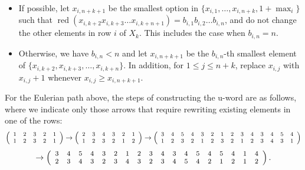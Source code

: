 \documentclass[12pt]{article}
\DeclareMathOperator{\red}{red}
\begin{document}
\begin{itemize}
\item If possible, let $x_{i,n+k+1}$ be the smallest option in  
$\{x_{i,1},\ldots,x_{i,n+k},1+\max_i\}$ such that  
$\red(x_{i,k+2}x_{i,k+3}\ldots x_{i,k+n+1}) = b_{i,1}b_{i,2}\ldots b_{i,n}$,  
and do not change the other elements in row $i$ of $X_k$.  
This includes the case when $b_{i,n} = n$.

\item Otherwise, we have $b_{i,n} < n$ and let $x_{i,n+k+1}$ be the $b_{i,n}$-th smallest element of  
$\{x_{i,k+2},x_{i,k+3},\ldots,x_{i,k+n}\}$.  
In addition, for $1 \leq j \leq n+k$, replace $x_{i,j}$ with $x_{i,j}+1$ whenever $x_{i,j} \geq x_{i,n+k+1}$.
\end{itemize}
For the Eulerian path above,  the steps of constructing the u-word are as follows, where we   
indicate only those arrows that require rewriting existing elements in one of the rows:
\begin{equation*}
{\footnotesize
\left(\begin{array}{ccccc}
 1& 2 & 3 & 2 & 1\\
1 & 2 & 3 & 2 & 1
\end{array}\right)
\rightarrow
\left(\begin{array}{cccccc}
2 & 3 & 4 & 3 & 2 & 1 \\
1 & 2 & 3 & 2 & 1 & 2
\end{array}\right)
\rightarrow
\left(\begin{array}{cccccccccccccc}
3 & 4 & 5 & 4 & 3 & 2 & 1 & 2 & 3 & 4 & 3 & 4 & 5 & 4 \\
1 & 2 & 3 & 2 & 1 & 2 & 3 & 2 & 1 & 2 & 3 & 4 & 3 & 1
\end{array}\right)
}
\end{equation*}
\begin{equation*}
\rightarrow {\footnotesize
\left(\begin{array}{cccccccccccccccccc}
3 & 4 & 5 & 4 & 3 & 2 & 1 & 2 & 3 & 4 & 3 & 4 & 5 & 4 & 5 & 4 & 1 & 4 \\
2 & 3 & 4 & 3 & 2 & 3 & 4 & 3 & 2 & 3 & 4 & 5 & 4 & 2 & 1 & 2 & 1 & 2
\end{array}\right).
}
\end{equation*}
 
\end{document}
